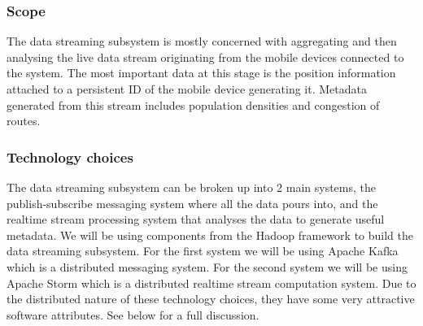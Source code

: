 \subsubsection{Scope}
The data streaming subsystem is mostly concerned with aggregating and then analysing the live data stream originating from the mobile devices connected to the system. The most important data at this stage is the position information attached to a persistent ID of the mobile device generating it. Metadata generated from this stream includes population densities and congestion of routes.
\subsubsection{Technology choices}
The data streaming subsystem can be broken up into 2 main systems, the publish-subscribe messaging system where all the data pours into, and the realtime stream processing system that analyses the data to generate useful metadata.
We will be using components from the Hadoop framework to build the data streaming subsystem. For the first system we will be using Apache Kafka which is a distributed messaging system. For the second system we will be using Apache Storm which is a distributed realtime stream computation system. Due to the distributed nature of these technology choices, they have some very attractive software attributes. See below for a full discussion.
